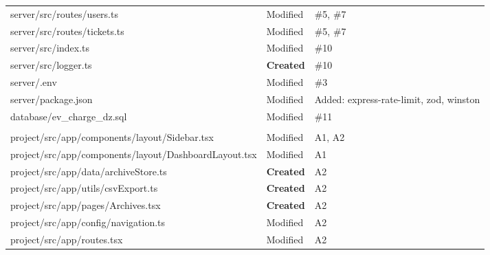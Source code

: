 \documentclass[12pt,a4paper]{report}
\begin{document}
\begin{longtable}{
			>{\ttfamily\small}p{7.8cm}
			p{2.2cm}
			p{3.2cm}
		}
		\rowcolor{rowalt}
		server/src/routes/users.ts &
		\textcolor{highorange}{Modified} & \#5, \#7 \\
		
		server/src/routes/tickets.ts &
		\textcolor{highorange}{Modified} & \#5, \#7 \\
		
		\rowcolor{rowalt}
		server/src/index.ts &
		\textcolor{highorange}{Modified} & \#10 \\
		
		server/src/logger.ts &
		\textcolor{greenfg}{\textbf{Created}} & \#10 \\
		
		\rowcolor{rowalt}
		server/.env &
		\textcolor{highorange}{Modified} & \#3 \\
		
		server/package.json &
		\textcolor{highorange}{Modified} &
		\small{Added: express-rate-limit, zod, winston} \\
		
		\rowcolor{rowalt}
		database/ev\_charge\_dz.sql &
		\textcolor{highorange}{Modified} & \#11 \\

		\multicolumn{3}{l}{\cellcolor{lightblue}\textbf{\color{brandblue}
		Feature Additions --- May 2026}} \\

		\rowcolor{rowalt}
		project/src/app/components/layout/Sidebar.tsx &
		\textcolor{highorange}{Modified} & A1, A2 \\

		project/src/app/components/layout/DashboardLayout.tsx &
		\textcolor{highorange}{Modified} & A1 \\

		\rowcolor{rowalt}
		project/src/app/data/archiveStore.ts &
		\textcolor{greenfg}{\textbf{Created}} & A2 \\

		project/src/app/utils/csvExport.ts &
		\textcolor{greenfg}{\textbf{Created}} & A2 \\

		\rowcolor{rowalt}
		project/src/app/pages/Archives.tsx &
		\textcolor{greenfg}{\textbf{Created}} & A2 \\

		project/src/app/config/navigation.ts &
		\textcolor{highorange}{Modified} & A2 \\

		\rowcolor{rowalt}
		project/src/app/routes.tsx &
		\textcolor{highorange}{Modified} & A2 \\


\end{longtable}
\end{document}
